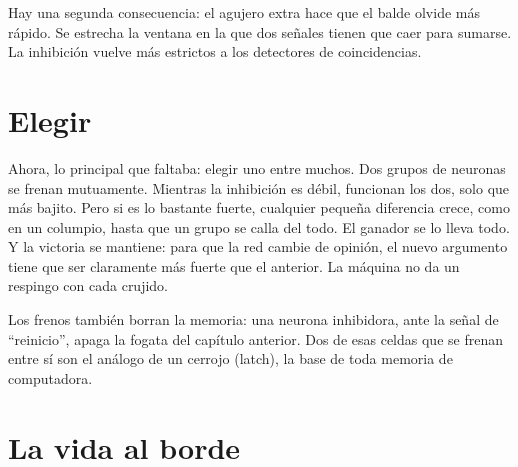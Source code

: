 
Hay una segunda consecuencia: el agujero extra hace que el balde olvide más rápido. Se estrecha la ventana en la que dos señales tienen que caer para sumarse. La inhibición vuelve más estrictos a los detectores de coincidencias.

\section*{Elegir}

Ahora, lo principal que faltaba: elegir uno entre muchos. Dos grupos de neuronas se frenan mutuamente. Mientras la inhibición es débil, funcionan los dos, solo que más bajito. Pero si es lo bastante fuerte, cualquier pequeña diferencia crece, como en un columpio, hasta que un grupo se calla del todo. El ganador se lo lleva todo. Y la victoria se mantiene: para que la red cambie de opinión, el nuevo argumento tiene que ser claramente más fuerte que el anterior. La máquina no da un respingo con cada crujido.

Los frenos también borran la memoria: una neurona inhibidora, ante la señal de “reinicio”, apaga la fogata del capítulo anterior. Dos de esas celdas que se frenan entre sí son el análogo de un cerrojo (latch), la base de toda memoria de computadora.

\section*{La vida al borde}

